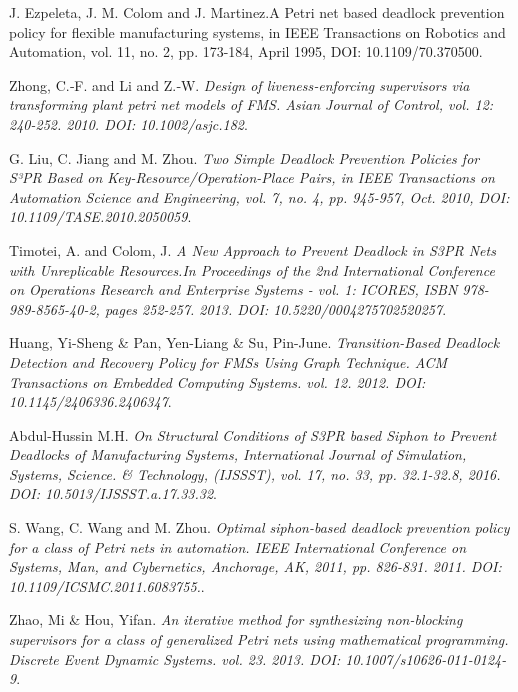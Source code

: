 \begin{thebibliography}{9}
    J. Ezpeleta, J. M. Colom and J. Martinez.A Petri net based deadlock prevention policy for flexible manufacturing systems, in IEEE Transactions on Robotics and Automation, vol. 11, no. 2, pp. 173-184, April 1995, DOI: 10.1109/70.370500.
 
    Zhong, C.‐F. and Li and Z.‐W.
    \textit{Design of liveness‐enforcing supervisors via transforming plant petri net models of FMS. Asian Journal of Control, vol. 12: 240-252. 2010. DOI: 10.1002/asjc.182}.
 
    G. Liu, C. Jiang and M. Zhou.
    \textit{Two Simple Deadlock Prevention Policies for S³PR Based on Key-Resource/Operation-Place Pairs, in IEEE Transactions on Automation Science and Engineering, vol. 7, no. 4, pp. 945-957, Oct. 2010, DOI: 10.1109/TASE.2010.2050059}.
    
    Timotei, A. and Colom, J.
    \textit{A New Approach to Prevent Deadlock in S3PR Nets with Unreplicable Resources.In Proceedings of the 2nd International Conference on Operations Research and Enterprise Systems - vol. 1: ICORES, ISBN 978-989-8565-40-2, pages 252-257. 2013. DOI: 10.5220/0004275702520257}.
    
    Huang, Yi-Sheng \& Pan, Yen-Liang \& Su, Pin-June.
    \textit{Transition-Based Deadlock Detection and Recovery Policy for FMSs Using Graph Technique. ACM Transactions on Embedded Computing Systems. vol. 12. 2012. DOI: 10.1145/2406336.2406347}.
    
    Abdul-Hussin M.H.
    \textit{On Structural Conditions of S3PR based Siphon to Prevent Deadlocks of Manufacturing Systems, International Journal of  Simulation, Systems, Science. \& Technology, (IJSSST), vol. 17, no. 33, pp. 32.1-32.8, 2016. DOI: 10.5013/IJSSST.a.17.33.32}.
    
    S. Wang, C. Wang and M. Zhou.
    \textit{Optimal siphon-based deadlock prevention policy for a class of Petri nets in automation. IEEE International Conference on Systems, Man, and Cybernetics, Anchorage, AK, 2011, pp. 826-831. 2011. DOI: 10.1109/ICSMC.2011.6083755.}.
    
    Zhao, Mi \& Hou, Yifan.
    \textit{An iterative method for synthesizing non-blocking supervisors for a class of generalized Petri nets using mathematical programming. Discrete Event Dynamic Systems. vol. 23. 2013. DOI: 10.1007/s10626-011-0124-9}.
    

\end{thebibliography}
